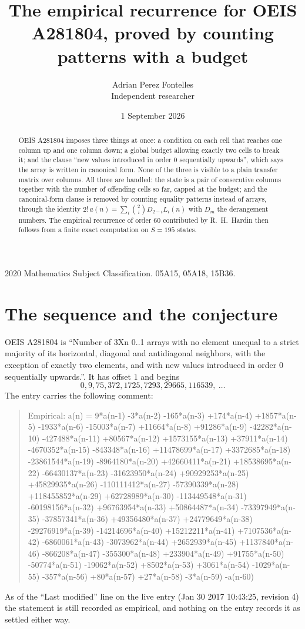 \documentclass[11pt,a4paper]{article}
\title{The empirical recurrence for OEIS A281804, proved by counting patterns with a budget}
\author{Adrian Perez Fontelles\\ \small Independent researcher}
\date{1 September 2026}
\theoremstyle{plain}
\theoremstyle{definition}
\begin{document}
\maketitle

\begin{abstract}
OEIS A281804 imposes three things at once: a condition on each cell that reaches one column up and
one column down; a global budget allowing exactly two cells to
break it; and the clause ``new values introduced in order $0$ sequentially upwards'', which
says the array is written in canonical form. None of the three is visible to a plain transfer
matrix over columns. All three are handled: the state is a pair of consecutive columns
together with the number of offending cells so far, capped at the budget; and the
canonical-form clause is removed by counting equality patterns instead of arrays, through the
identity $2!\,a(n)=\sum_i\binom{2}{i}D_{2-i}L_i(n)$ with $D_m$ the derangement
numbers. The empirical recurrence of order $60$ contributed by R.~H.~Hardin then follows
from a finite exact computation on $S=195$ states.
\end{abstract}

\noindent\small 2020 Mathematics Subject Classification. 05A15, 05A18, 15B36.\normalsize

\section{The sequence and the conjecture}

OEIS A281804 is ``Number of 3Xn 0..1 arrays with no element unequal to a strict majority of its horizontal, diagonal and antidiagonal neighbors, with the exception of exactly two elements, and with new values introduced in order 0 sequentially upwards.''. It has offset $1$ and begins
\[
0, 9, 75, 372, 1725, 7293, 29665, 116539,\ \dots
\]
The entry carries the following comment:
\begin{quote}\small
Empirical: a(n) = 9*a(n-1) -3*a(n-2) -165*a(n-3) +174*a(n-4) +1857*a(n-5) -1933*a(n-6) -15003*a(n-7) +11664*a(n-8) +91286*a(n-9) -42282*a(n-10) -427488*a(n-11) +80567*a(n-12) +1573155*a(n-13) +37911*a(n-14) -4670352*a(n-15) -843348*a(n-16) +11478699*a(n-17) +3372685*a(n-18) -23861544*a(n-19) -8964180*a(n-20) +42660411*a(n-21) +18538695*a(n-22) -66430137*a(n-23) -31623950*a(n-24) +90929253*a(n-25) +45829935*a(n-26) -110111412*a(n-27) -57390339*a(n-28) +118455852*a(n-29) +62728989*a(n-30) -113449548*a(n-31) -60198156*a(n-32) +96763954*a(n-33) +50864487*a(n-34) -73397949*a(n-35) -37857341*a(n-36) +49356480*a(n-37) +24779649*a(n-38) -29276919*a(n-39) -14214696*a(n-40) +15212211*a(n-41) +7107536*a(n-42) -6860061*a(n-43) -3073962*a(n-44) +2652939*a(n-45) +1137840*a(n-46) -866208*a(n-47) -355300*a(n-48) +233904*a(n-49) +91755*a(n-50) -50774*a(n-51) -19062*a(n-52) +8502*a(n-53) +3061*a(n-54) -1029*a(n-55) -357*a(n-56) +80*a(n-57) +27*a(n-58) -3*a(n-59) -a(n-60)
\end{quote}
As of the ``Last modified'' line on the live entry (Jan 30 2017 10:43:25, revision 4) the statement is
still recorded as empirical, and nothing on the entry records it as settled either way.
\end{document}

